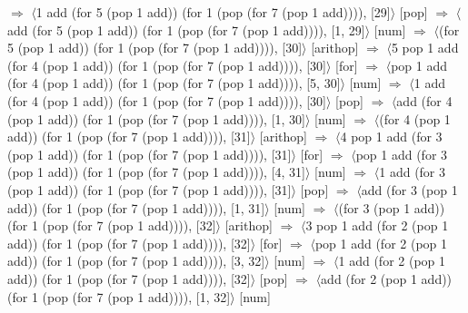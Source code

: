 \documentclass[12pt]{report}
\begin{document}
$\Rightarrow$ $\langle$1 add (for 5 (pop 1 add)) (for 1 (pop (for 7 (pop 1 add)))), [29]$\rangle$ \hfill [pop] \newline
$\Rightarrow$ $\langle$add (for 5 (pop 1 add)) (for 1 (pop (for 7 (pop 1 add)))), [1, 29]$\rangle$ \hfill [num] \newline
$\Rightarrow$ $\langle$(for 5 (pop 1 add)) (for 1 (pop (for 7 (pop 1 add)))), [30]$\rangle$ \hfill [arithop] \newline
$\Rightarrow$ $\langle$5 pop 1 add (for 4 (pop 1 add)) (for 1 (pop (for 7 (pop 1 add)))), [30]$\rangle$ \hfill [for] \newline
$\Rightarrow$ $\langle$pop 1 add (for 4 (pop 1 add)) (for 1 (pop (for 7 (pop 1 add)))), [5, 30]$\rangle$ \hfill [num] \newline
$\Rightarrow$ $\langle$1 add (for 4 (pop 1 add)) (for 1 (pop (for 7 (pop 1 add)))), [30]$\rangle$ \hfill [pop] \newline
$\Rightarrow$ $\langle$add (for 4 (pop 1 add)) (for 1 (pop (for 7 (pop 1 add)))), [1, 30]$\rangle$ \hfill [num] \newline
$\Rightarrow$ $\langle$(for 4 (pop 1 add)) (for 1 (pop (for 7 (pop 1 add)))), [31]$\rangle$ \hfill [arithop] \newline
$\Rightarrow$ $\langle$4 pop 1 add (for 3 (pop 1 add)) (for 1 (pop (for 7 (pop 1 add)))), [31]$\rangle$ \hfill [for] \newline
$\Rightarrow$ $\langle$pop 1 add (for 3 (pop 1 add)) (for 1 (pop (for 7 (pop 1 add)))), [4, 31]$\rangle$ \hfill [num] \newline
$\Rightarrow$ $\langle$1 add (for 3 (pop 1 add)) (for 1 (pop (for 7 (pop 1 add)))), [31]$\rangle$ \hfill [pop] \newline
$\Rightarrow$ $\langle$add (for 3 (pop 1 add)) (for 1 (pop (for 7 (pop 1 add)))), [1, 31]$\rangle$ \hfill [num] \newline
$\Rightarrow$ $\langle$(for 3 (pop 1 add)) (for 1 (pop (for 7 (pop 1 add)))), [32]$\rangle$ \hfill [arithop] \newline
$\Rightarrow$ $\langle$3 pop 1 add (for 2 (pop 1 add)) (for 1 (pop (for 7 (pop 1 add)))), [32]$\rangle$ \hfill [for] \newline
$\Rightarrow$ $\langle$pop 1 add (for 2 (pop 1 add)) (for 1 (pop (for 7 (pop 1 add)))), [3, 32]$\rangle$ \hfill [num] \newline
$\Rightarrow$ $\langle$1 add (for 2 (pop 1 add)) (for 1 (pop (for 7 (pop 1 add)))), [32]$\rangle$ \hfill [pop] \newline
$\Rightarrow$ $\langle$add (for 2 (pop 1 add)) (for 1 (pop (for 7 (pop 1 add)))), [1, 32]$\rangle$ \hfill [num] \newline
\end{document}
